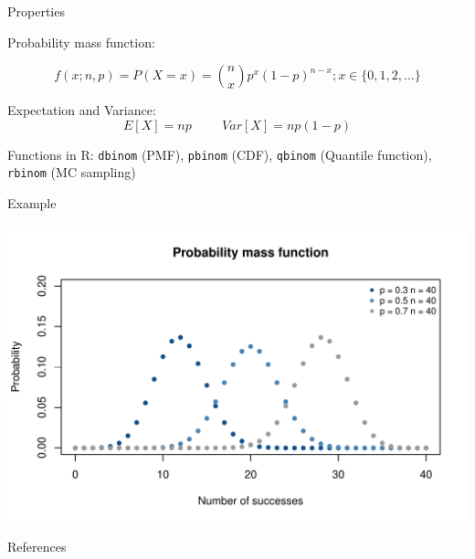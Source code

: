 \documentclass[english]{beamer}\usepackage[]{graphicx}\usepackage[]{xcolor}
\makeatletter
\def\maxwidth{ %
  \ifdim\Gin@nat@width>\linewidth
    \linewidth
  \else
    \Gin@nat@width
  \fi
}
\newenvironment{knitrout}{}{} %
\makeatother
\begin{document}
\begin{frame}{Properties}

Probability mass function:

\[
f(x; n, p) = P(X = x) = \binom{n}{x} p^x (1-p)^{n-x}; x \in \{0, 1, 2, ...\}
\]

Expectation and Variance:
\[
E[X] = np \hspace{1cm} Var[X] = np(1-p)
\]

Functions in R:
\texttt{dbinom} (PMF), \texttt{pbinom} (CDF), \texttt{qbinom} (Quantile function),
\texttt{rbinom} (MC sampling)

\end{frame}
\begin{frame}{Example}

\begin{knitrout}
\color{fgcolor}
\includegraphics[width=\maxwidth]{figures/figunnamed-chunk-2-1} 
\end{knitrout}

\end{frame}
\begin{frame}{References}
   \footnotesize
   
   \nocite{held2014}

\end{frame}

\end{document}
